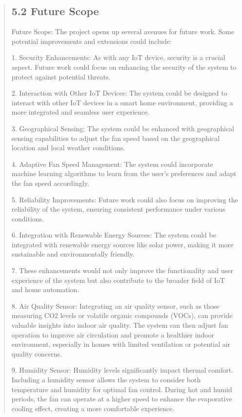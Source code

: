 \documentclass[12pt]{report}
\begin{document}
\begin{quote}
		
		\clearpage
		
		
		\subsection{5.2 Future Scope}
			Future Scope: The project opens up several avenues for future work. Some potential improvements and extensions could include:
			
			1. Security Enhancements: As with any IoT device, security is a crucial aspect. Future work could focus on enhancing the security of the system to protect against potential threats.
			
			2. Interaction with Other IoT Devices: The system could be designed to interact with other IoT devices in a smart home environment, providing a more integrated and seamless user experience.
			
			3. Geographical Sensing: The system could be enhanced with geographical sensing capabilities to adjust the fan speed based on the geographical location and local weather conditions.
			
			4. Adaptive Fan Speed Management: The system could incorporate machine learning algorithms to learn from the user’s preferences and adapt the fan speed accordingly.
			
			5. Reliability Improvements: Future work could also focus on improving the reliability of the system, ensuring consistent performance under various conditions.
			
			6. Integration with Renewable Energy Sources: The system could be integrated with renewable energy sources like solar power, making it more sustainable and environmentally friendly.
			
			7. These enhancements would not only improve the functionality and user experience of the system but also contribute to the broader field of IoT and home automation.
			
			8. Air Quality Sensor:  Integrating an air quality sensor, such as those measuring CO2 levels or volatile organic compounds (VOCs), can provide valuable insights into indoor air quality. The system can then adjust fan operation to improve air circulation and promote a healthier indoor environment, especially in homes with limited ventilation or potential air quality concerns.
			
			9. Humidity Sensor: Humidity levels significantly impact thermal comfort. Including a humidity sensor allows the system to consider both temperature and humidity for optimal fan control. During hot and humid periods, the fan can operate at a higher speed to enhance the evaporative cooling effect, creating a more comfortable experience.
			

\end{quote}
\end{document}
